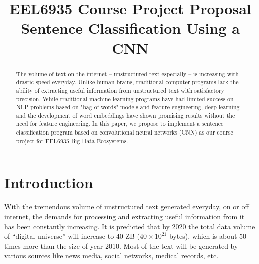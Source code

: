 \documentclass[conference]{IEEEtran}
\begin{document}
\title{EEL6935 Course Project Proposal \\
    Sentence Classification Using a CNN}
\author{
}

\maketitle

\begin{abstract}
    The volume of text on the internet -- unstructured text especially --
    is increasing with drastic speed everyday. Unlike
    human brains, traditional computer programs lack the ability of extracting
    useful information from unstructured text with satisfactory precision. 
    While traditional machine learning programs have had limited success
    on NLP problems based on "bag of words" models and feature engineering, 
    deep learning and the development of word embeddings have shown 
    promising results without the need for feature engineering. In this paper, 
    we propose to implement a sentence classification program based on 
    convolutional neural networks (CNN) as our course project for 
    EEL6935 Big Data Ecosystems. 
\end{abstract}

\IEEEpeerreviewmaketitle

\section{Introduction}
    With the tremendous volume of unstructured text generated everyday, on or off 
    internet, the demands for processing and extracting useful information 
    from it has been constantly increasing. It is predicted that by 2020 the 
    total data volume of ``digital universe'' will increase to 40 ZB 
    ($40\times 10^{21}$ bytes), which is about 50 times more than the size of 
    year 2010\cite{gantz2012digital}. Most of the text will be generated by various 
    sources like news media, social networks, medical records, etc.
    
\end{document}
